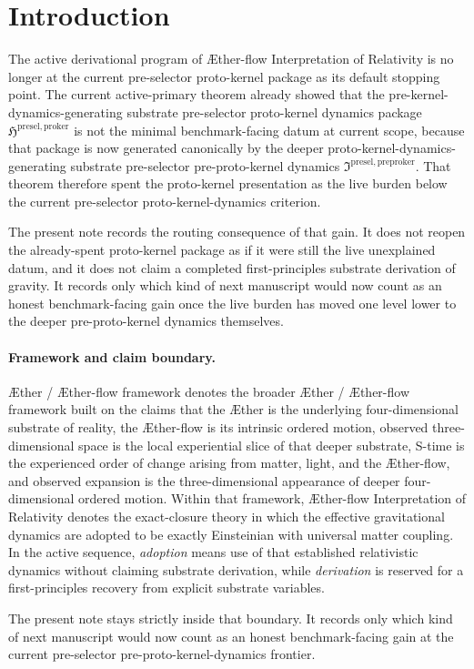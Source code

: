 \documentclass[11pt]{article}
\newcommand{\Aether}{\AE{}ther}
\newcommand{\Aflow}{\AE{}ther-flow}
\newcommand{\TheoryName}{\Aflow{} Interpretation of Relativity}
\newcommand{\TheoryProgram}{\Aether{} / \Aflow{} framework}
\newcommand{\PreProtoKernelPackage}{\mathfrak I^{\mathrm{presel,preproker}}}
\newcommand{\ProtoKernelPackage}{\mathfrak H^{\mathrm{presel,proker}}}
\begin{document}
\section{Introduction}

The active derivational program of \TheoryName{} is no longer at the current pre-selector proto-kernel package as its default stopping point. The current active-primary theorem already showed that the pre-kernel-dynamics-generating substrate pre-selector proto-kernel dynamics package \(\ProtoKernelPackage\) is not the minimal benchmark-facing datum at current scope, because that package is now generated canonically by the deeper proto-kernel-dynamics-generating substrate pre-selector pre-proto-kernel dynamics \(\PreProtoKernelPackage\). That theorem therefore spent the proto-kernel presentation as the live burden below the current pre-selector proto-kernel-dynamics criterion.

The present note records the routing consequence of that gain. It does not reopen the already-spent proto-kernel package as if it were still the live unexplained datum, and it does not claim a completed first-principles substrate derivation of gravity. It records only which kind of next manuscript would now count as an honest benchmark-facing gain once the live burden has moved one level lower to the deeper pre-proto-kernel dynamics themselves.

\paragraph{Framework and claim boundary.}
\TheoryProgram{} denotes the broader \Aether{} / \Aflow{} framework built on the claims that the \Aether{} is the underlying four-dimensional substrate of reality, the \Aflow{} is its intrinsic ordered motion, observed three-dimensional space is the local experiential slice of that deeper substrate, S-time is the experienced order of change arising from matter, light, and the \Aflow{}, and observed expansion is the three-dimensional appearance of deeper four-dimensional ordered motion. Within that framework, \TheoryName{} denotes the exact-closure theory in which the effective gravitational dynamics are adopted to be exactly Einsteinian with universal matter coupling. In the active sequence, \emph{adoption} means use of that established relativistic dynamics without claiming substrate derivation, while \emph{derivation} is reserved for a first-principles recovery from explicit substrate variables.

The present note stays strictly inside that boundary. It records only which kind of next manuscript would now count as an honest benchmark-facing gain at the current pre-selector pre-proto-kernel-dynamics frontier.
\end{document}

